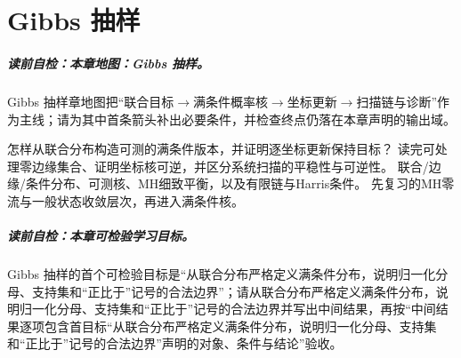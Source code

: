 \chapter{Gibbs 抽样}\label{chap:V5-C04}

\paragraph{读前自检：本章地图：Gibbs 抽样。}Gibbs 抽样章地图把“联合目标$\to$满条件概率核$\to$坐标更新$\to$扫描链与诊断”作为主线；请为其中首条箭头补出必要条件，并检查终点仍落在本章声明的输出域。\par

{怎样从联合分布构造可测的满条件版本，并证明逐坐标更新保持目标？}
{读完可处理零边缘集合、证明坐标核可逆，并区分系统扫描的平稳性与可逆性。}
{联合/边缘/条件分布、可测核、MH细致平衡，以及有限链与Harris条件。}
{先复习的MH零流与一般状态收敛层次，再进入满条件核。}
\label{struct:V5-C04-CH01}
\paragraph{读前自检：本章可检验学习目标。}Gibbs 抽样的首个可检验目标是“从联合分布严格定义满条件分布，说明归一化分母、支持集和“正比于”记号的合法边界”；请从联合分布严格定义满条件分布，说明归一化分母、支持集和“正比于”记号的合法边界并写出中间结果，再按“中间结果逐项包含首目标“从联合分布严格定义满条件分布，说明归一化分母、支持集和“正比于”记号的合法边界”声明的对象、条件与结论”验收。\par


